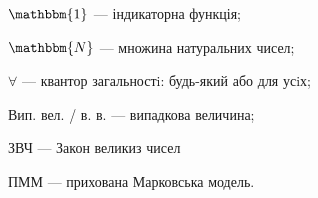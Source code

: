 $\mathbbm{1}$ --- індикаторна функція;

$\mathbbm{N}$ --- множина натуральних чисел;

$\forall$ --- квантор загальностi: будь-який або для усiх;

Вип. вел. / в. в. --- випадкова величина;

ЗВЧ --- Закон великиз чисел

ПММ --- прихована Марковська модель.